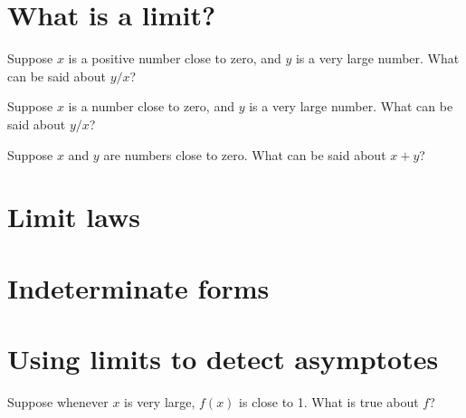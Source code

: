 \documentclass{ximera}
\begin{document}
\section{What is a limit?}

\begin{problem}
  Suppose $x$ is a positive number close to zero, and $y$ is a very large number.  What can be said about $y/x$?
  \begin{multipleChoice}
  \end{multipleChoice}
\end{problem}

\begin{problem}
  Suppose $x$ is a number close to zero, and $y$ is a very large number.  What can be said about $y/x$?
  \begin{multipleChoice}
  \end{multipleChoice}
\end{problem}

\begin{problem}
  Suppose $x$ and $y$ are numbers close to zero.  What can be said about $x+y$?
  \begin{multipleChoice}
  \end{multipleChoice}
\end{problem}

\section{Limit laws}



\section{Indeterminate forms}
\section{Using limits to detect asymptotes}

\begin{problem}
  Suppose whenever $x$ is very large, $f(x)$ is close to 1.  What is true about $f$?
  \begin{multipleChoice}
  \end{multipleChoice}
\end{problem}
\end{document}
